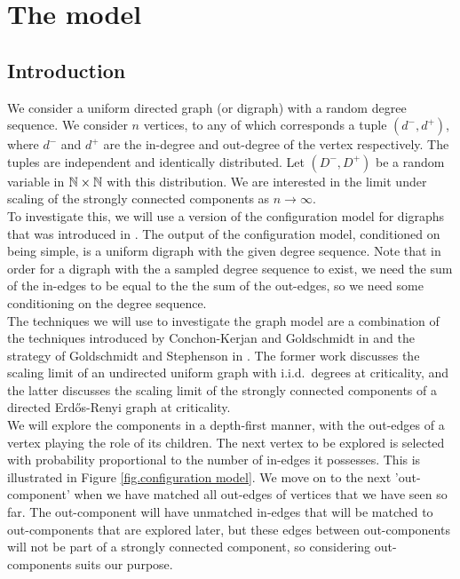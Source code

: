 \section{The model}
\subsection{Introduction}
We consider a uniform directed graph (or digraph) with a random degree sequence. We consider $n$ vertices, to any of which corresponds a tuple $(d^-,d^+)$, where $d^-$ and $d^+$ are the in-degree and out-degree of the vertex respectively. The tuples are independent and identically distributed. Let $(D^-,D^+)$ be a random variable in ${\mathbb N}\times {\mathbb N}$ with this distribution. We are interested in the limit under scaling of the strongly connected components as $n\to \infty$.  \\
To investigate this, we will use a version of the configuration model for digraphs that was introduced in \cite{Cooper2004}. The output of the configuration model, conditioned on being simple, is a uniform digraph with the given degree sequence. Note that in order for a digraph with the a sampled degree sequence to exist, we need the sum of the in-edges to be equal to the the sum of the out-edges, so we need some conditioning on the degree sequence.\\
The techniques we will use to investigate the graph model are a combination of the techniques introduced by Conchon-Kerjan and Goldschmidt in \cite{Conchon2018} and the strategy of Goldschmidt and Stephenson in \cite{Goldschmidt2019}. The former work discusses the scaling limit of an undirected uniform graph with i.i.d.\ degrees at criticality, and the latter discusses the scaling limit of the strongly connected components of a directed Erd\H{o}s-Renyi graph at criticality.\\
We will explore the components in a depth-first manner, with the out-edges of a vertex playing the role of its children. The next vertex to be explored is selected with probability proportional to the number of in-edges it possesses. This is illustrated in Figure \ref{fig.configuration model}. We move on to the next 'out-component' when we have matched all out-edges of vertices that we have seen so far. The out-component will have unmatched in-edges that will be matched to out-components that are explored later, but these edges between out-components will not be part of a strongly connected component, so considering out-components suits our purpose. \\
